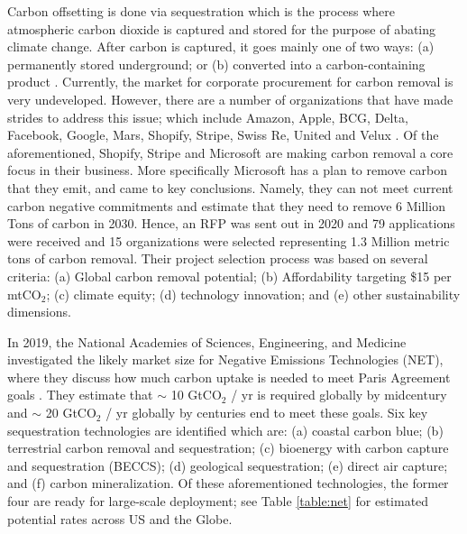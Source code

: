 \documentclass{article}
\begin{document}
Carbon offsetting is done via sequestration which is the process where atmospheric carbon dioxide is captured and stored for the purpose of abating climate change. After carbon is captured, it goes mainly one of two ways: (a) permanently stored underground; or (b) converted into a carbon-containing product \cite{CBC19}. Currently, the market for corporate procurement for carbon removal is very undeveloped. However, there are a number of organizations that have made strides to address this issue; which include Amazon, Apple, BCG, Delta, Facebook, Google, Mars, Shopify, Stripe, Swiss Re, United and Velux \cite{Mic21}. Of the aforementioned, Shopify, Stripe and Microsoft are making carbon removal a core focus in their business. More specifically Microsoft has a plan to remove carbon that they emit, and came to key conclusions. Namely, they can not meet current carbon negative commitments and estimate that they need to remove 6 Million Tons of carbon in 2030. Hence, an RFP was sent out in 2020 and 79 applications were received and 15 organizations were selected representing 1.3 Million metric tons of carbon removal. Their project selection process was based on several criteria: (a) Global carbon removal potential; (b) Affordability targeting \$15 per mtCO$_{2}$; (c) climate equity; (d) technology innovation; and (e) other sustainability dimensions. 

In 2019, the National Academies of Sciences, Engineering, and Medicine investigated the likely market size for Negative Emissions Technologies (NET), where they discuss how much carbon uptake is needed to meet Paris Agreement goals \cite{NET19}. They estimate that $\sim$ 10 GtCO$_{2}$ / yr is required globally by midcentury and $\sim$ 20 GtCO$_{2}$ / yr globally by centuries end to meet these goals. Six key sequestration technologies are identified which are: (a) coastal carbon blue; (b) terrestrial carbon removal and sequestration; (c) bioenergy with carbon capture and sequestration (BECCS); (d) geological sequestration; (e) direct air capture;  and (f) carbon mineralization. Of these aforementioned technologies, the former four are ready for large-scale deployment; see Table \ref{table:net} for estimated potential rates across US and the Globe.
\end{document}
